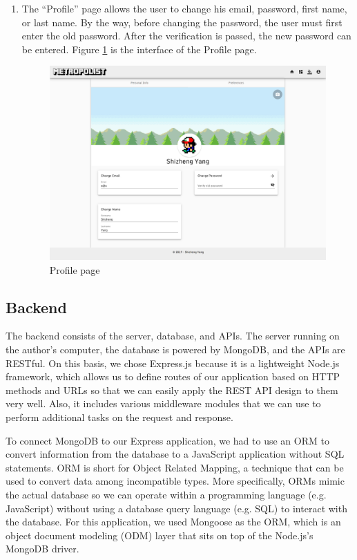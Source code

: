 \begin{enumerate}
  \item The ``Profile'' page allows the user to change his email, password, first name, or last name. By the way, before changing the password, the user must first enter the old password. After the verification is passed, the new password can be entered. Figure \ref{fig:GUI profile} is the interface of the Profile page.

  \begin{figure}[htbp]
    \includegraphics[width=\textwidth]{section04/assets/GUI-profile.png}
    \caption{Profile page}
    \label{fig:GUI profile}
  \end{figure}

\end{enumerate}

\subsection{Backend}
The backend consists of the server, database, and APIs. The server running on the author's computer, the database is powered by MongoDB, and the APIs are RESTful. On this basis, we chose Express.js because it is a lightweight Node.js framework, which allows us to define routes of our application based on HTTP methods and URLs so that we can easily apply the REST API design to them very well. Also, it includes various middleware modules that we can use to perform additional tasks on the request and response.

To connect MongoDB to our Express application, we had to use an ORM to convert information from the database to a JavaScript application without SQL statements. ORM is short for Object Related Mapping, a technique that can be used to convert data among incompatible types. More specifically, ORMs mimic the actual database so we can operate within a programming language (e.g. JavaScript) without using a database query language (e.g. SQL) to interact with the database. For this application, we used Mongoose as the ORM, which is an object document modeling (ODM) layer that sits on top of the Node.js's MongoDB driver.

